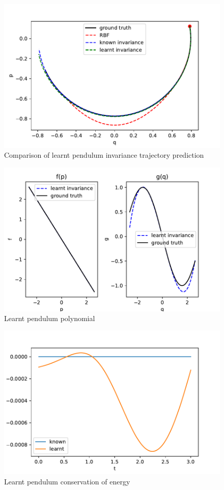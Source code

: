 \documentclass{statsmsc}
\begin{document}
\begin{figure}[H] 
  \includegraphics[width=0.6\linewidth]{../codes/figures/parameterised_pendulum_predicted_trajectory.pdf}
  \centering
  \caption{Comparison of learnt pendulum invariance trajectory prediction}
  \label{fig:parameterised_pendulum_trajectory}
\end{figure}

\begin{figure}[H] 
  \includegraphics[width=0.6\linewidth]{../codes/figures/parameterised_pendulum_learnt_polynomial.pdf}
  \centering
  \caption{Learnt pendulum polynomial}
  \label{fig:parameterised_pendulum_polynomial}
\end{figure}

\begin{figure}[H] 
  \includegraphics[width=0.6\linewidth]{../codes/figures/parameterised_pendulum_conservation_of_energy.pdf}
  \centering
  \caption{Learnt pendulum conservation of energy}
  \label{fig:parameterised_pendulum_conserve_energy}
\end{figure}
\end{document}
